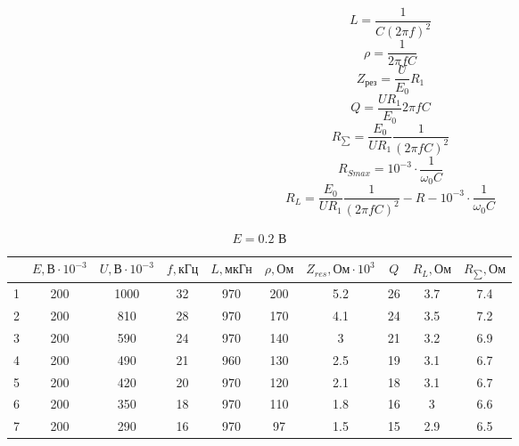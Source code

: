 \documentclass[a4paper, 12pt]{article}%
\begin{document}
\[L=\frac{1}{C(2\pi f)^2} \]
\[\rho=\frac{1}{2\pi fC} \]
\[Z_{\text{рез}}=\frac{U}{E_0}R_1\]
\[Q=\frac{UR_1}{E_0}2\pi fC\]
\[R_{\sum}=\frac{E_0}{UR_1}\frac{1}{(2\pi fC)^2}\]
\[R_{Smax}=10^{-3}\cdot\frac{1}{\omega_0C}\]
\[R_L=\frac{E_0}{UR_1}\frac{1}{(2\pi fC)^2}-R-10^{-3}\cdot\frac{1}{\omega_0C}\]

\begin{table}[!ht]
\center
\caption{$E=0.2$ В}
\begin{tabular}{|c|c|c|c|c|c|c|c|c|c|}
\hline
\rowcolor[HTML]{C0C0C0}
 & $E, \text{В}\cdot 10^{-3} $ & $U, \text{В}\cdot 10^{-3} $ & $f, \text{кГц}$ & $L, \text{мкГн}$ & $\rho, \text{Ом}$ & $Z_{res}, \text{Ом}\cdot 10^{3} $ & $Q$ & $R_L, \text{Ом}$ & $R_{\sum}, \text{Ом}$ \\ \hline
\cellcolor[HTML]{C0C0C0} 1 & 200 & 1000 & 32 & 970 & 200 & 5.2 & 26 & 3.7 & 7.4 \\ \hline
\rowcolor[HTML]{EFEFEF} 
\cellcolor[HTML]{C0C0C0} 2 & 200 & 810 & 28 & 970 & 170 & 4.1 & 24 & 3.5 & 7.2 \\ \hline
\cellcolor[HTML]{C0C0C0} 3 & 200 & 590 & 24 & 970 & 140 & 3 & 21 & 3.2 & 6.9 \\ \hline
\rowcolor[HTML]{EFEFEF} 
\cellcolor[HTML]{C0C0C0} 4 & 200 & 490 & 21 & 960 & 130 & 2.5 & 19 & 3.1 & 6.7 \\ \hline
\cellcolor[HTML]{C0C0C0} 5 & 200 & 420 & 20 & 970 & 120 & 2.1 & 18 & 3.1 & 6.7 \\ \hline
\rowcolor[HTML]{EFEFEF} 
\cellcolor[HTML]{C0C0C0} 6 & 200 & 350 & 18 & 970 & 110 & 1.8 & 16 & 3 & 6.6 \\ \hline
\cellcolor[HTML]{C0C0C0} 7 & 200 & 290 & 16 & 970 & 97 & 1.5 & 15 & 2.9 & 6.5 \\ \hline
\end{tabular}
\end{table}
\end{document}
